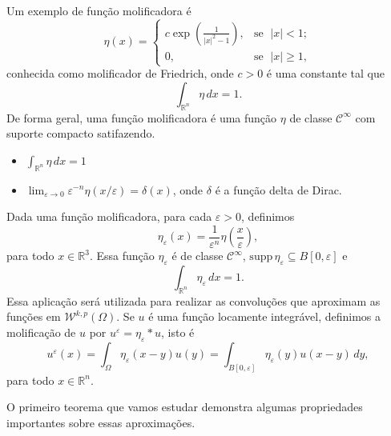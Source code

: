 \documentclass[a4paper, 11pt]{book}
\theoremstyle{definition}
\newcommand{\bR}{\mathbb{R}}
\newcommand{\cC}{\mathcal{C}}
\newcommand{\cW}{\mathcal{W}}
\newcommand{\supp}{\mathrm{supp}\,}
\begin{document}
Um exemplo de função molificadora é
\begin{equation} \label{eq:molificador-friedrich}
    \eta(x) =
    \left\{
        \begin{array}{lr}
            c \exp \left( \frac{1}{|x|^2 - 1} \right), &\! \text{se }\; |x| < 1;\\
            0, &\!\text{se }\; |x| \geqslant 1,
        \end{array}
    \right.
\end{equation}
conhecida como molificador de Friedrich, onde $c > 0$ é uma constante tal que
\[
    \int_{\bR^n} \eta \,dx = 1.
\]
De forma geral, uma função molificadora é uma função $\eta$ de classe $\cC^\infty$ com suporte compacto satifazendo. 
\begin{itemize}[leftmargin=*, label=\small{$\bullet$}]
    \item $\displaystyle \int_{\bR^n} \eta \,dx = 1$
    \item $\displaystyle \lim_{\varepsilon \to 0} \varepsilon^{-n}\eta(x/\varepsilon) = \delta(x)$, onde $\delta$ é a função delta de Dirac.
\end{itemize}
Dada uma função molificadora, para cada $\varepsilon > 0$, definimos
\begin{equation} \label{eq:eta-epsilon}
    \eta_\varepsilon(x) = \frac{1}{\varepsilon^n} \eta\left( \frac{x}{\varepsilon} \right), 
\end{equation}
para todo $x \in \bR^3$. Essa função $\eta_\varepsilon$ é de classe $\cC^\infty$, $\supp \eta_\varepsilon \subseteq B[0,\varepsilon]$ e
\[
    \int_{\bR^n} \eta_\varepsilon \,dx = 1.
\]
Essa aplicação será utilizada para realizar as convoluções que aproximam as funções em $\cW^{k,p}(\Omega)$. Se $u$ é uma função locamente integrável, definimos a molificação de $u$ por $u^\varepsilon = \eta_\varepsilon * u$, isto é
\[
    u^\varepsilon(x) = \int_\Omega \eta_\varepsilon(x-y) u(y) = \int_{B[0,\varepsilon]} \eta_\varepsilon(y) u(x-y) \,dy,
\]
para todo $x \in \bR^n$.

O primeiro teorema que vamos estudar demonstra algumas propriedades importantes sobre essas aproximações.
\end{document}
